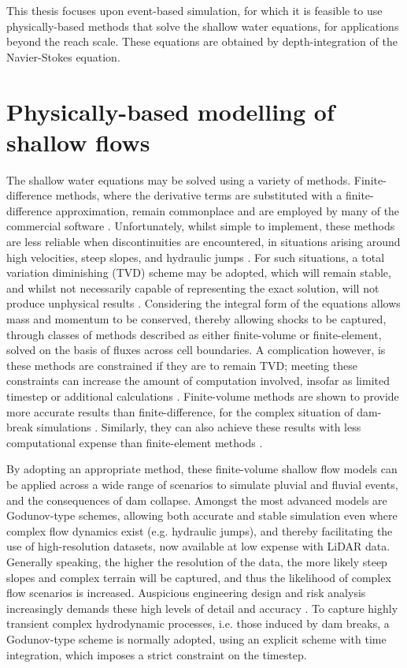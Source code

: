 This thesis focuses upon event-based simulation, for which it is feasible to use physically-based methods that solve the shallow water equations, for applications beyond the reach scale. These equations are obtained by depth-integration of the Navier-Stokes equation.

\section{Physically-based modelling of shallow flows}

The shallow water equations may be solved using a variety of methods. Finite-difference methods, where the derivative terms are substituted with a finite-difference approximation, remain commonplace and are employed by many of the commercial software \citep{Dyke2007,Hunter2008, BMTWBM2011a}. Unfortunately, whilst simple to implement, these methods are less reliable when discontinuities are encountered, in situations arising around high velocities, steep slopes, and hydraulic jumps \citep{Preiswerk1940}. For such situations, a total variation diminishing (TVD) scheme may be adopted, which will remain stable, and whilst not necessarily capable of representing the exact solution, will not produce unphysical results \citep{Harten1997,Laney1998}. Considering the integral form of the equations allows mass and momentum to be conserved, thereby allowing shocks to be captured, through classes of methods described as either finite-volume or finite-element, solved on the basis of fluxes across cell boundaries. A complication however, is these methods are constrained if they are to remain TVD; meeting these constraints can increase the amount of computation involved, insofar as limited timestep or additional calculations \citep{Courant1967}. Finite-volume methods are shown to provide more accurate results than finite-difference, for the complex situation of dam-break simulations \citep{Zoppou2003}. Similarly, they can also achieve these results with less computational expense than finite-element methods \citep[e.g.][]{Lukacova-Medvidova2006}.

By adopting an appropriate method, these finite-volume shallow flow models can be applied across a wide range of scenarios to simulate pluvial and fluvial events, and the consequences of dam collapse. Amongst the most advanced models are Godunov-type schemes, allowing both accurate and stable simulation even where complex flow dynamics exist (e.g. hydraulic jumps), and thereby facilitating the use of high-resolution datasets, now available at low expense with LiDAR data. Generally speaking, the higher the resolution of the data, the more likely steep slopes and complex terrain will be captured, and thus the likelihood of complex flow scenarios is increased. Auspicious engineering design and risk analysis increasingly demands these high levels of detail and accuracy \citep{Marks2000,French2003,Haile2005}. To capture highly transient complex hydrodynamic processes, i.e. those induced by dam breaks, a Godunov-type scheme is normally adopted, using an explicit scheme with time integration, which imposes a strict constraint on the timestep.

